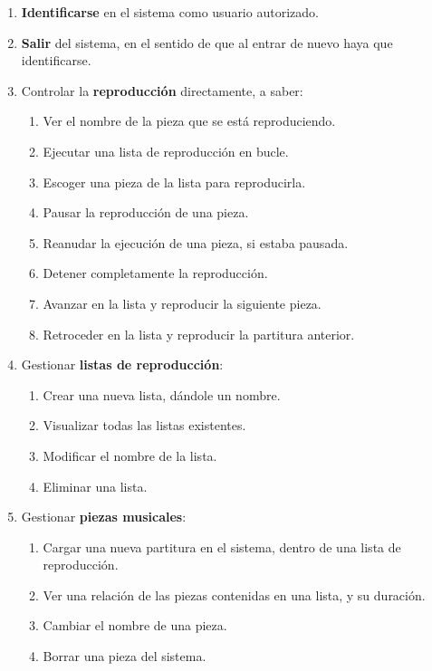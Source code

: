 \begin{enumerate}
	\item \textbf{Identificarse} en el sistema como usuario autorizado.
	\item \textbf{Salir} del sistema, en el sentido de que al entrar de nuevo haya que identificarse.
	\item Controlar la \textbf{reproducción} directamente, a saber:
	
	\begin{enumerate}
		\item Ver el nombre de la pieza que se está reproduciendo.
		\item Ejecutar una lista de reproducción en bucle.
		\item Escoger una pieza de la lista para reproducirla.
		\item Pausar la reproducción de una pieza.
		\item Reanudar la ejecución de una pieza, si estaba pausada.
		\item Detener completamente la reproducción.
		\item Avanzar en la lista y reproducir la siguiente pieza.
		\item Retroceder en la lista y reproducir la partitura anterior.
	\end{enumerate}
	
	\item Gestionar \textbf{listas de reproducción}:
	
	\begin{enumerate}
		\item Crear una nueva lista, dándole un nombre.
		\item Visualizar todas las listas existentes.
		\item Modificar el nombre de la lista.
		\item Eliminar una lista.
	\end{enumerate}
	
	\item Gestionar \textbf{piezas musicales}:
	
	\begin{enumerate}
		\item Cargar una nueva partitura en el sistema, dentro de una lista de reproducción.
		\item Ver una relación de las piezas contenidas en una lista, y su duración.
		\item Cambiar el nombre de una pieza.
		\item Borrar una pieza del sistema.
	\end{enumerate}
	

\end{enumerate}
